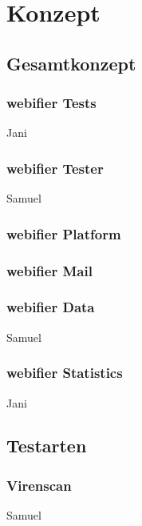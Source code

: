 \chapter{Konzept}

\section{Gesamtkonzept}

\subsection{webifier Tests}

\todo Jani

\subsection{webifier Tester}

\todo Samuel

\subsection{webifier Platform}


\subsection{webifier Mail}


\subsection{webifier Data}

\todo Samuel

\subsection{webifier Statistics}

\todo Jani

\section{Testarten}

\subsection{Virenscan}

\todo Samuel

